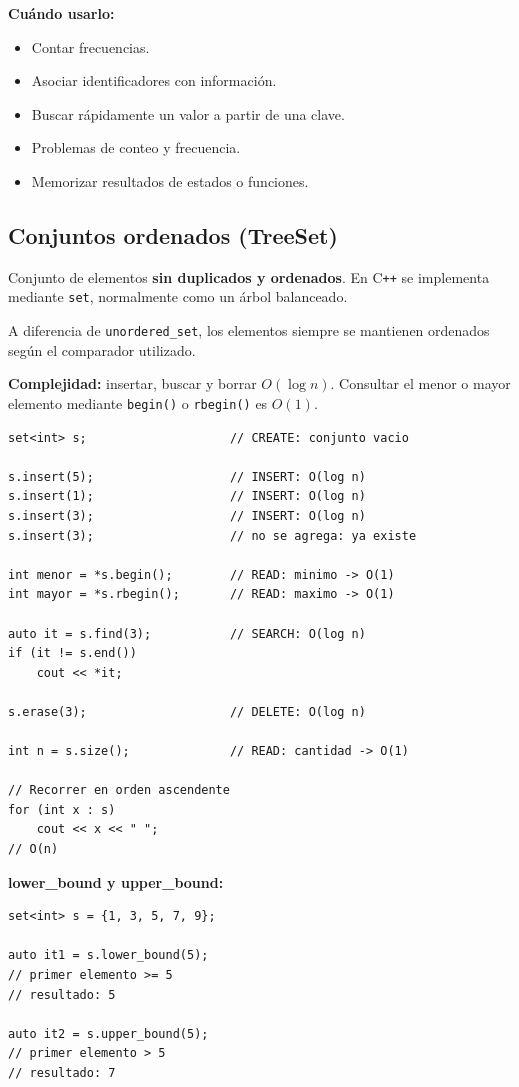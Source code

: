 \documentclass[10pt,a4paper,twocolumn]{article}
\begin{document}
\textbf{Cuándo usarlo:}
\begin{itemize}
    \item Contar frecuencias.
    \item Asociar identificadores con información.
    \item Buscar rápidamente un valor a partir de una clave.
    \item Problemas de conteo y frecuencia.
    \item Memorizar resultados de estados o funciones.
\end{itemize}


\subsection{Conjuntos ordenados (TreeSet)}

Conjunto de elementos \textbf{sin duplicados y ordenados}.
En C\texttt{++} se implementa mediante \texttt{set}, normalmente como
un árbol balanceado.

A diferencia de \texttt{unordered\_set}, los elementos siempre se
mantienen ordenados según el comparador utilizado.

\textbf{Complejidad:} insertar, buscar y borrar $O(\log n)$.
Consultar el menor o mayor elemento mediante \texttt{begin()} o
\texttt{rbegin()} es $O(1)$.

\begin{lstlisting}[style=cpp]
set<int> s;                    // CREATE: conjunto vacio

s.insert(5);                   // INSERT: O(log n)
s.insert(1);                   // INSERT: O(log n)
s.insert(3);                   // INSERT: O(log n)
s.insert(3);                   // no se agrega: ya existe

int menor = *s.begin();        // READ: minimo -> O(1)
int mayor = *s.rbegin();       // READ: maximo -> O(1)

auto it = s.find(3);           // SEARCH: O(log n)
if (it != s.end())
    cout << *it;

s.erase(3);                    // DELETE: O(log n)

int n = s.size();              // READ: cantidad -> O(1)

// Recorrer en orden ascendente
for (int x : s)
    cout << x << " ";
// O(n)
\end{lstlisting}

\textbf{lower\_bound y upper\_bound:}

\begin{lstlisting}[style=cpp]
set<int> s = {1, 3, 5, 7, 9};

auto it1 = s.lower_bound(5);
// primer elemento >= 5
// resultado: 5

auto it2 = s.upper_bound(5);
// primer elemento > 5
// resultado: 7
\end{lstlisting}
\end{document}
